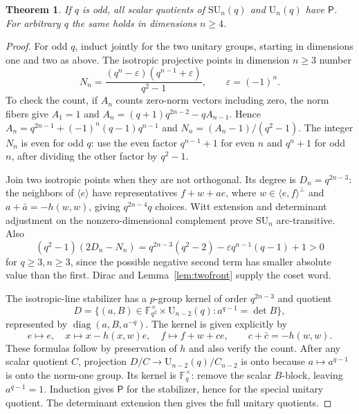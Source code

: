 \documentclass[11pt]{article}
\newtheorem{theorem}{Theorem}[section]
\theoremstyle{definition}
\newcommand{\F}{\mathbb F}
\newcommand{\Pp}{\mathsf P}
\newcommand{\SU}{\mathrm{SU}}
\newcommand{\U}{\mathrm U}
\newcommand{\diag}{\operatorname{diag}}
\begin{document}
\begin{theorem}\label{thm:unitaryhigher}
If $q$ is odd, all scalar quotients of $\SU_n(q)$ and $\U_n(q)$ have $\Pp$. For arbitrary $q$ the same holds in dimensions $n\ge4$.
\end{theorem}
\begin{proof}
For odd $q$, induct jointly for the two unitary groups, starting in dimensions one and two as above. The isotropic projective points in dimension $n\ge3$ number
\[
N_n=\frac{(q^n-\varepsilon)(q^{n-1}+\varepsilon)}{q^2-1},\qquad \varepsilon=(-1)^n.
\]
To check the count, if $A_n$ counts zero-norm vectors including zero, the norm fibers give $A_1=1$ and $A_n=(q+1)q^{2n-2}-qA_{n-1}$. Hence $A_n=q^{2n-1}+(-1)^n(q-1)q^{n-1}$ and $N_n=(A_n-1)/(q^2-1)$. The integer $N_n$ is even for odd $q$: use the even factor $q^{n-1}+1$ for even $n$ and $q^n+1$ for odd $n$, after dividing the other factor by $q^2-1$.

Join two isotropic points when they are not orthogonal. Its degree is $D_n=q^{2n-3}$: the neighbors of $\langle e\rangle$ have representatives $f+w+ae$, where $w\in\langle e,f\rangle^\perp$ and $a+\bar a=-h(w,w)$, giving $q^{2n-4}q$ choices. Witt extension and determinant adjustment on the nonzero-dimensional complement prove $\SU_n$ arc-transitive. Also
\[
(q^2-1)(2D_n-N_n)
=q^{2n-3}(q^2-2)-\varepsilon q^{n-1}(q-1)+1>0
\]
for $q\ge3,n\ge3$, since the possible negative second term has smaller absolute value than the first. Dirac and Lemma~\ref{lem:twofront} supply the coset word.

The isotropic-line stabilizer has a $p$-group kernel of order $q^{2n-3}$ and quotient
\[
D=\{(a,B)\in\F_{q^2}^{\times}\times\U_{n-2}(q):a^{q-1}=\det B\},
\]
represented by $\diag(a,B,a^{-q})$. The kernel is given explicitly by
\[
e\mapsto e,\quad x\mapsto x-h(x,w)e,\quad f\mapsto f+w+ce,
\qquad c+\bar c=-h(w,w).
\]
These formulas follow by preservation of $h$ and also verify the count. After any scalar quotient $C$, projection $D/C\to\U_{n-2}(q)/C_{n-2}$ is onto because $a\mapsto a^{q-1}$ is onto the norm-one group. Its kernel is $\F_q^\times$: remove the scalar $B$-block, leaving $a^{q-1}=1$. Induction gives $\Pp$ for the stabilizer, hence for the special unitary quotient. The determinant extension then gives the full unitary quotients.


\end{proof}
\end{document}
